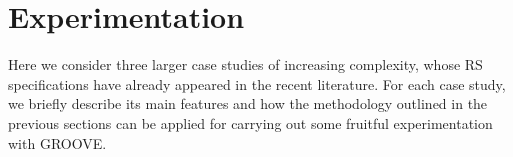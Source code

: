 
\section{Experimentation}\label{sec:experiments}

Here we consider three larger case studies of increasing complexity, whose RS specifications have already appeared in the recent literature. For each case study, we briefly describe its main features and how the methodology outlined in the previous sections can be applied for carrying out some fruitful experimentation with GROOVE.
